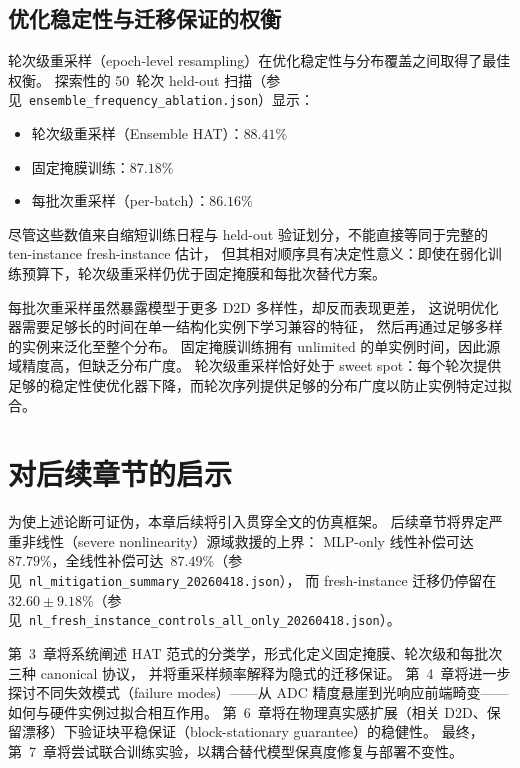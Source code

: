 \subsection{优化稳定性与迁移保证的权衡}

轮次级重采样（epoch-level resampling）在优化稳定性与分布覆盖之间取得了最佳权衡。
探索性的 50~轮次 held-out 扫描（参见~\texttt{ensemble\_frequency\_ablation.json}）显示：
\begin{itemize}
    \item 轮次级重采样（Ensemble HAT）：$\mathbf{88.41\%}$
    \item 固定掩膜训练：$\mathbf{87.18\%}$
    \item 每批次重采样（per-batch）：$\mathbf{86.16\%}$
\end{itemize}
尽管这些数值来自缩短训练日程与 held-out 验证划分，不能直接等同于完整的 ten-instance fresh-instance 估计，
但其相对顺序具有决定性意义：即使在弱化训练预算下，轮次级重采样仍优于固定掩膜和每批次替代方案。

每批次重采样虽然暴露模型于更多 D2D 多样性，却反而表现更差，
这说明优化器需要足够长的时间在单一结构化实例下学习兼容的特征，
然后再通过足够多样的实例来泛化至整个分布。
固定掩膜训练拥有 unlimited 的单实例时间，因此源域精度高，但缺乏分布广度。
轮次级重采样恰好处于 sweet spot：每个轮次提供足够的稳定性使优化器下降，而轮次序列提供足够的分布广度以防止实例特定过拟合。

\section{对后续章节的启示}

为使上述论断可证伪，本章后续将引入贯穿全文的仿真框架。
后续章节将界定严重非线性（severe nonlinearity）源域救援的上界：
MLP-only 线性补偿可达~$87.79\%$，全线性补偿可达~$87.49\%$（参见~\texttt{nl\_mitigation\_summary\_20260418.json}），
而 fresh-instance 迁移仍停留在~$32.60\pm9.18\%$（参见~\texttt{nl\_fresh\_instance\_controls\_all\_only\_20260418.json}）。

第~3~章将系统阐述 HAT 范式的分类学，形式化定义固定掩膜、轮次级和每批次三种 canonical 协议，
并将重采样频率解释为隐式的迁移保证。
第~4~章将进一步探讨不同失效模式（failure modes）——从 ADC 精度悬崖到光响应前端畸变——如何与硬件实例过拟合相互作用。
第~6~章将在物理真实感扩展（相关 D2D、保留漂移）下验证块平稳保证（block-stationary guarantee）的稳健性。
最终，第~7~章将尝试联合训练实验，以耦合替代模型保真度修复与部署不变性。
